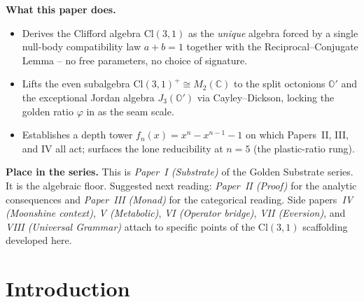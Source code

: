 \documentclass[11pt,a4paper]{article}
\theoremstyle{plain}
\theoremstyle{definition}
\theoremstyle{remark}
\numberwithin{equation}{section}
\providecommand{\Cl}{\mathrm{Cl}}
\providecommand{\C}{\mathbb{C}}
\providecommand{\Os}{\mathbb{O}'}
\providecommand{\vp}{\varphi}
\DeclareMathOperator{\Der}{Der}
\begin{document}
\begin{abstract}
\medskip\noindent\textbf{Scope of this paper.}  Pure algebra and
arithmetic.  No analytic number theory, no spectral arguments, no
RH proof.  All theorems here are independently checkable: the
Reciprocal--Conjugate Lemma is a polynomial identity, the
Cayley--Dickson construction is a classical doubling, and the
$J_3(\Os)$ identification follows from Albert's classification of
simple finite-dimensional Jordan algebras.  The
$\dim\Der(J_3(\Os)) = 52$ result is verified by direct numerical
computation (\cref{sec:tests}).
\end{abstract}

\medskip
\noindent\textbf{What this paper does.}
\begin{itemize}[leftmargin=1.5em,nosep,topsep=2pt]
  \item Derives the Clifford algebra $\Cl(3,1)$ as the
        \emph{unique} algebra forced by a single null-body
        compatibility law $a + b = 1$ together with the
        Reciprocal--Conjugate Lemma -- no free parameters, no
        choice of signature.
  \item Lifts the even subalgebra $\Cl(3,1)^{+}\cong M_{2}(\C)$ to
        the split octonions $\Os$ and the exceptional Jordan algebra
        $J_{3}(\Os)$ via Cayley--Dickson, locking the golden ratio
        $\vp$ in as the seam scale.
  \item Establishes a depth tower
        $f_{n}(x) = x^{n} - x^{n-1} - 1$ on which Papers~II, III,
        and IV all act; surfaces the lone reducibility at $n=5$
        (the plastic-ratio rung).
\end{itemize}

\medskip
\noindent\textbf{Place in the series.}
This is \emph{Paper~I (Substrate)} of the Golden Substrate series.
It is the algebraic floor.  Suggested next reading:
\emph{Paper~II (Proof)} for the analytic consequences and
\emph{Paper~III (Monad)} for the categorical reading.  Side
papers~\emph{IV (Moonshine context)}, \emph{V (Metabolic)},
\emph{VI (Operator bridge)}, \emph{VII (Eversion)}, and
\emph{VIII (Universal Grammar)} attach to specific points of the
$\Cl(3,1)$ scaffolding developed here.

\tableofcontents
\clearpage

\section{Introduction}
\label{sec:intro}
\end{document}
